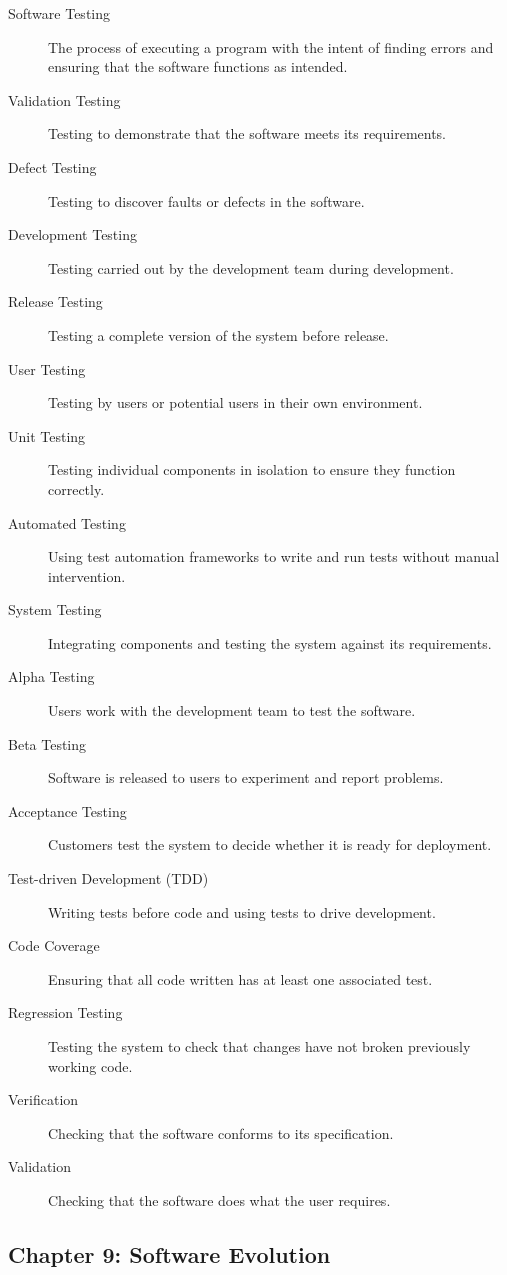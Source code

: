 \documentclass{article}
\begin{document}
\begin{description}
  \item[Software Testing] The process of executing a program with the intent of finding errors and ensuring that the software functions as intended.
  \item[Validation Testing] Testing to demonstrate that the software meets its requirements.
  \item[Defect Testing] Testing to discover faults or defects in the software.
  \item[Development Testing] Testing carried out by the development team during development.
  \item[Release Testing] Testing a complete version of the system before release.
  \item[User Testing] Testing by users or potential users in their own environment.
  \item[Unit Testing] Testing individual components in isolation to ensure they function correctly.
  \item[Automated Testing] Using test automation frameworks to write and run tests without manual intervention.
  \item[System Testing] Integrating components and testing the system against its requirements.
  \item[Alpha Testing] Users work with the development team to test the software.
  \item[Beta Testing] Software is released to users to experiment and report problems.
  \item[Acceptance Testing] Customers test the system to decide whether it is ready for deployment.
  \item[Test-driven Development (TDD)] Writing tests before code and using tests to drive development.
  \item[Code Coverage] Ensuring that all code written has at least one associated test.
  \item[Regression Testing] Testing the system to check that changes have not broken previously working code.
  \item[Verification] Checking that the software conforms to its specification.
  \item[Validation] Checking that the software does what the user requires.
\end{description}

\subsection{Chapter 9: Software Evolution}
\end{document}
